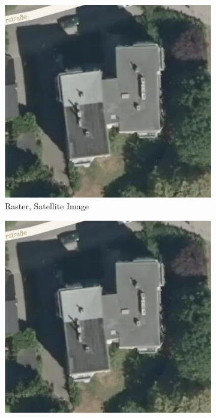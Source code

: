 \begin{figure}[!htb]
  \centering
  \begin{subfigure}[t]{.30\linewidth}
    \centering\includegraphics[page=1,clip,trim=0cm 0cm 0cm 0cm,width=.99\linewidth]{chapter_1_intro/imgs/gis_types.pdf}
    \caption{\label{fig:ch1_gis_type_a}Raster, Satellite Image}
  \end{subfigure}
  \begin{subfigure}[t]{.30\linewidth}
    \centering\includegraphics[page=2,clip,trim=0cm 0cm 0cm 0cm,width=.99\linewidth]{chapter_1_intro/imgs/gis_types.pdf}

\end{subfigure}
\end{figure}

